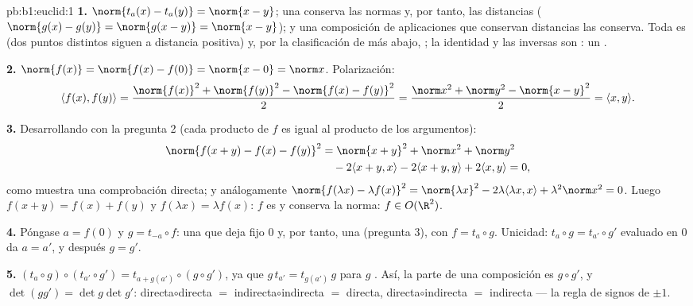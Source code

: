 \begin{solution}{pb:b1:euclid:1}
\textbf{1.} $\norm{t_a(x) - t_a(y)} = \norm{x - y}$; una 
 conserva las normas y, por tanto, las distancias
($\norm{g(x) - g(y)} = \norm{g(x - y)} = \norm{x-y}$); y una
composición de aplicaciones que conservan distancias las conserva.
Toda  es  (dos puntos distintos siguen a
distancia positiva) y, por la clasificación de más abajo,
; la identidad y las inversas son : un .

\textbf{2.} $\norm{f(x)} = \norm{f(x) - f(0)} = \norm{x - 0} =
\norm x$. Polarización:
\[
\langle f(x), f(y)\rangle
= \frac{\norm{f(x)}^2 + \norm{f(y)}^2 - \norm{f(x) -
f(y)}^2}{2}
= \frac{\norm x^2 + \norm y^2 - \norm{x - y}^2}{2}
= \langle x, y\rangle .
\]

\textbf{3.} Desarrollando con la pregunta 2 (cada producto de $f$ es
igual al producto de los argumentos):
\begin{align*}
\norm{f(x+y) - f(x) - f(y)}^2
&= \norm{x+y}^2 + \norm x^2 + \norm y^2\\
&\quad - 2\langle x+y, x\rangle - 2\langle x+y, y\rangle
+ 2\langle x, y\rangle = 0 ,
\end{align*}
como muestra una comprobación directa; y análogamente
$\norm{f(\lambda x) - \lambda f(x)}^2 = \norm{\lambda x}^2 -
2\lambda\langle \lambda x, x\rangle + \lambda^2\norm x^2 = 0$. Luego
$f(x + y) = f(x) + f(y)$ y $f(\lambda x) = \lambda f(x)$: $f$ es
 y conserva la norma: $f \in O(\R^2)$.

\textbf{4.} Póngase $a = f(0)$ y $g = t_{-a}\circ f$: una 
que deja fijo $0$ y, por tanto, una  
(pregunta 3), con $f = t_a \circ g$. Unicidad:
$t_a \circ g = t_{a'}\circ g'$ evaluado en $0$ da $a = a'$, y después
$g = g'$.

\textbf{5.} $(t_a\circ g)\circ(t_{a'}\circ g') = t_{a +
g(a')}\circ(g\circ g')$, ya que $g\,t_{a'} = t_{g(a')}\,g$ para $g$
. Así, la parte  de una composición es $g \circ g'$, y
$\det(gg') = \det g \det g'$: directa$\circ$directa $=$
indirecta$\circ$indirecta $=$ directa,
directa$\circ$indirecta $=$ indirecta --- la regla de signos de $\pm1$.


\end{solution}
